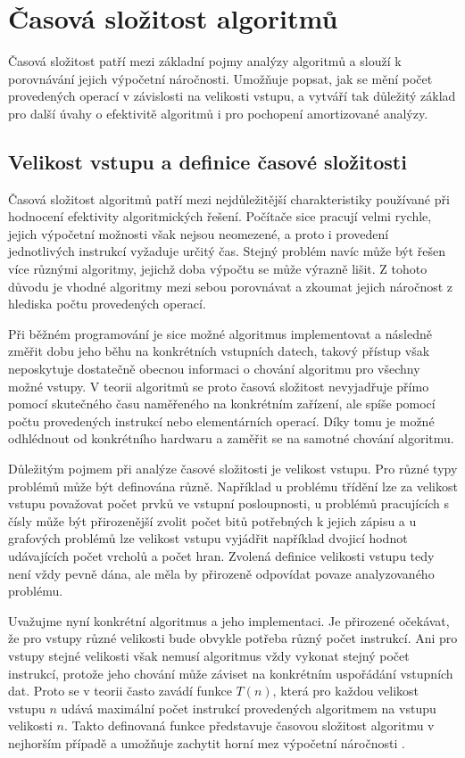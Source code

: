 \section{Časová složitost algoritmů}
Časová složitost patří mezi základní pojmy analýzy algoritmů a slouží k porovnávání jejich výpočetní náročnosti. Umožňuje popsat, jak se mění počet provedených operací v závislosti na velikosti vstupu, a vytváří tak důležitý základ pro další úvahy o efektivitě algoritmů i pro pochopení amortizované analýzy.

\subsection{Velikost vstupu a definice časové složitosti}
Časová složitost algoritmů patří mezi nejdůležitější charakteristiky používané při hodnocení efektivity algoritmických řešení. Počítače sice pracují velmi rychle, jejich výpočetní možnosti však nejsou neomezené, a proto i provedení jednotlivých instrukcí vyžaduje určitý čas. Stejný problém navíc může být řešen více různými algoritmy, jejichž doba výpočtu se může výrazně lišit. Z tohoto důvodu je vhodné algoritmy mezi sebou porovnávat a zkoumat jejich náročnost z hlediska počtu provedených operací.

Při běžném programování je sice možné algoritmus implementovat a následně změřit dobu jeho běhu na konkrétních vstupních datech, takový přístup však neposkytuje dostatečně obecnou informaci o chování algoritmu pro všechny možné vstupy. V teorii algoritmů se proto časová složitost nevyjadřuje přímo pomocí skutečného času naměřeného na konkrétním zařízení, ale spíše pomocí počtu provedených instrukcí nebo elementárních operací. Díky tomu je možné odhlédnout od konkrétního hardwaru a zaměřit se na samotné chování algoritmu.

Důležitým pojmem při analýze časové složitosti je velikost vstupu. Pro různé typy problémů může být definována různě. Například u problému třídění lze za velikost vstupu považovat počet prvků ve vstupní posloupnosti, u problémů pracujících s čísly může být přirozenější zvolit počet bitů potřebných k jejich zápisu a u grafových problémů lze velikost vstupu vyjádřit například dvojicí hodnot udávajících počet vrcholů a počet hran. Zvolená definice velikosti vstupu tedy není vždy pevně dána, ale měla by přirozeně odpovídat povaze analyzovaného problému.

Uvažujme nyní konkrétní algoritmus a jeho implementaci. Je přirozené očekávat, že pro vstupy různé velikosti bude obvykle potřeba různý počet instrukcí. Ani pro vstupy stejné velikosti však nemusí algoritmus vždy vykonat stejný počet instrukcí, protože jeho chování může záviset na konkrétním uspořádání vstupních dat. Proto se v teorii často zavádí funkce \(T(n)\), která pro každou velikost vstupu \(n\) udává maximální počet instrukcí provedených algoritmem na vstupu velikosti \(n\). Takto definovaná funkce představuje časovou složitost algoritmu v nejhorším případě a umožňuje zachytit horní mez výpočetní náročnosti \cite{sawa_ti_03}.

